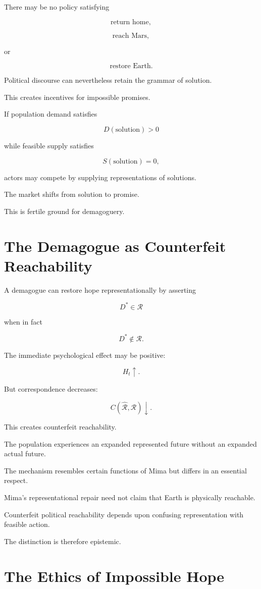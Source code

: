 \documentclass[11pt,oneside]{book}
\theoremstyle{definition}
\theoremstyle{remark}
\newcommand{\R}{\mathcal{R}}
\begin{document}
There may be no policy satisfying

\[
\text{return home},
\]

\[
\text{reach Mars},
\]

or

\[
\text{restore Earth}.
\]

Political discourse can nevertheless retain the grammar of solution.

This creates incentives for impossible promises.

If population demand satisfies

\[
D(\text{solution})>0
\]

while feasible supply satisfies

\[
S(\text{solution})=0,
\]

actors may compete by supplying representations of solutions.

The market shifts from solution to promise.

This is fertile ground for demagoguery.

\section{The Demagogue as Counterfeit Reachability}

A demagogue can restore hope representationally by asserting

\[
D^\ast\in\R
\]

when in fact

\[
D^\ast\notin\R.
\]

The immediate psychological effect may be positive:

\[
H_t\uparrow.
\]

But correspondence decreases:

\[
C(\widehat{\R},\R)\downarrow.
\]

This creates counterfeit reachability.

The population experiences an expanded represented future without an expanded actual future.

The mechanism resembles certain functions of Mima but differs in an essential respect.

Mima's representational repair need not claim that Earth is physically reachable.

Counterfeit political reachability depends upon confusing representation with feasible action.

The distinction is therefore epistemic.

\section{The Ethics of Impossible Hope}
\end{document}
